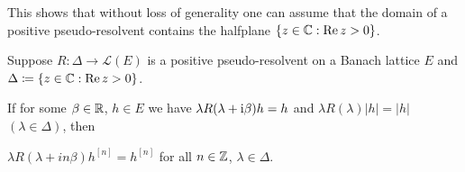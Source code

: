This shows that without loss of generality one can assume that the domain of a positive pseudo-resolvent contains the halfplane $\{z \in \mathbb{C}  : \mathop{}\!\mathrm{Re}\, z > 0\}$.
\begin{proposition}\label{prop:c3-2.7}
	Suppose $R : \Delta \to \mathcal{L}(E)$ is a positive pseudo-resolvent on a Banach lattice $E$ and $\Delta \coloneqq \{z \in \mathbb{C}  : \mathop{}\!\mathrm{Re}\, z > 0\}$.
	
	If for some $\beta \in \mathbb{R} $, $h \in E$ we have
	$\lambda R(\lambda+\mathrm{i}\beta)h = h$ and $\lambda R(\lambda)|h| = |h|$ $(\lambda \in \Delta)$, then
	
	$\lambda R(\lambda+in\beta)h^{[n]} = h^{[n]}$ for all $n \in \mathbb{Z}$, $\lambda \in \Delta$.
\end{proposition}


